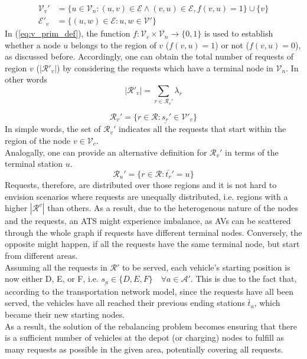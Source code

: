 \begin{align}
\mathcal{V}_v' &= \{ u \in \mathcal{V}_n : (u, v) \in \mathcal{E} \wedge (v, u) \in \mathcal{E} , f(v,u) = 1 \} \cup \{ v\} \label{eq:v_prim_def}\\
\mathcal{E}'_v &= \{ (u, w) \in \mathcal{E} : u, w \in \mathcal{V}' \} 
\end{align}
In (\ref{eq:v_prim_def}), the function $f :  \mathcal{V}_c \times \mathcal{V}_n \rightarrow \{0,1\}$ is used to establish whether a node $u$ belongs to the region of $v$ ($f(v,u) = 1$) or not ($f(v,u) = 0$), as discussed before. Accordingly, one can obtain the total number of requests of region $v$ ($|\mathcal{R}'_v|$) by considering the requests which have a terminal node in $\mathcal{V}_n$. In other words
\begin{equation}
|\mathcal{R}'_v| = \sum_{r \in \mathcal{R}_v'} \lambda_r
\end{equation}

\begin{equation}
\mathcal{R}_v'= \{ r \in \mathcal{R} : \underline{s_r}' \in \mathcal{V'}_v \} \label{eq:req_per_reg}
\end{equation}
In simple words, the set of $\mathcal{R}_v'$ indicates all the requests that start within the region of the node $v \in \mathcal{V}_c$. \\
Analogally, one can provide an alternative definition for $\mathcal{R}_v'$ in terms of the terminal station $u$.
\begin{equation}
	\mathcal{R}_u'= \{ r \in \mathcal{R} : \bar{t_r}' = u \}%
\end{equation}
Requests, therefore, are distributed over those regions and it is not hard to envision scenarios where requests are unequally distributed, i.e. regions with a higher $|\mathcal{R}^v| $ than others. As a result, due to the heterogenous nature of the nodes and the requests, an ATS might experience imbalance, as AVs can be scattered through the whole graph if requests have different terminal nodes. Conversely, the opposite might happen, if all the requests have the same terminal node, but start from different areas. \\ 
Assuming all the requests in $\mathcal{R}'$ to be served, each vehicle's starting position is now either D, E, or F, i.e. $\underline{s_a} \in \{D, E, F\} \quad \forall a \in \mathcal{A}'$. This is due to the fact that, according to the transportation network model, since the requests have all been served, the vehicles have all reached their previous ending stations $\bar{t}_a$, which became their new starting nodes. \\
As a result, the solution of the rebalancing problem becomes ensuring that there is a sufficient number of vehicles at the depot (or charging) nodes to fulfill as many requests as possible in the given area, potentially covering all requests.

